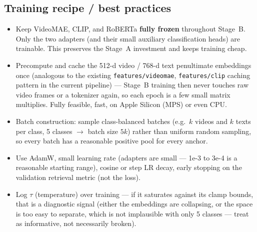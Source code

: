 \documentclass[11pt]{article}
\begin{document}
\subsection{Training recipe / best practices}
\begin{itemize}
\item Keep VideoMAE, CLIP, and RoBERTa \textbf{fully frozen} throughout Stage~B. Only the two
adapters (and their small auxiliary classification heads) are trainable. This preserves the
Stage~A investment and keeps training cheap.
\item Precompute and cache the 512-d video / 768-d text penultimate embeddings once (analogous to
the existing \texttt{features/videomae}, \texttt{features/clip} caching pattern in the current
pipeline) — Stage~B training then never touches raw video frames or a tokenizer again, so each
epoch is a few small matrix multiplies. Fully feasible, fast, on Apple Silicon (MPS) or even CPU.
\item Batch construction: sample class-balanced batches (e.g.\ $k$ videos and $k$ texts per class,
5 classes $\to$ batch size $5k$) rather than uniform random sampling, so every batch has a
reasonable positive pool for every anchor.
\item Use AdamW, small learning rate (adapters are small — 1e-3 to 3e-4 is a reasonable starting
range), cosine or step LR decay, early stopping on the validation retrieval metric (not the loss).
\item Log $\tau$ (temperature) over training — if it saturates against its clamp bounds, that is a
diagnostic signal (either the embeddings are collapsing, or the space is too easy to separate,
which is not implausible with only 5 classes — treat as informative, not necessarily broken).
\end{itemize}
\end{document}

